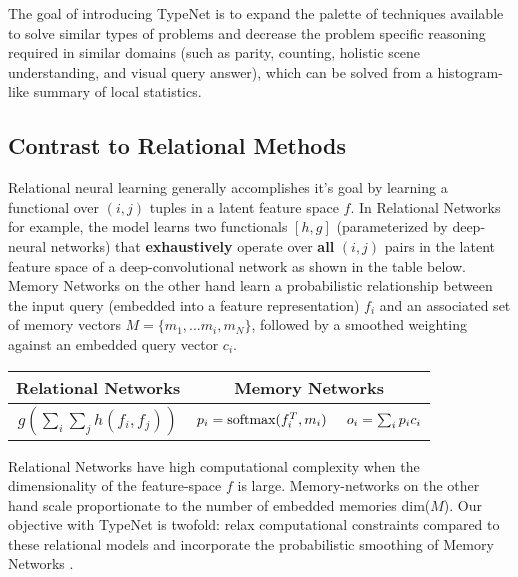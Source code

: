 The goal of introducing TypeNet is to expand the palette of
techniques available to solve similar types of problems and decrease
the problem specific reasoning required in similar
domains (such as parity, counting, holistic scene understanding, and
visual query answer), which can be solved from a histogram-like summary of
local statistics.

\subsection{Contrast to Relational Methods}

Relational neural learning generally accomplishes it's goal by
learning a functional over $(i,j)$ tuples in a latent feature space $f$. In
Relational Networks \cite{santoro2017simple} for example, the
model learns two functionals $[h, g]$ (parameterized by
deep-neural networks) that \textbf{exhaustively} operate over \textbf{all} $(i,j)$ pairs
in the latent feature space of a deep-convolutional network as shown
in the table below.
Memory Networks \cite{weston2014memory} on the other hand learn a probabilistic relationship
between the input query (embedded into a feature representation) $f_i$ and an
associated set of memory vectors $M = \{m_1, ... m_i, m_N \}$, followed by a smoothed weighting against an embedded query
vector $c_i$.
\vskip -0.2in
{\renewcommand{\arraystretch}{1.15}
\begin{center}
\begin{tabular}{ c | c } \hline
  Relational Networks & Memory Networks \\ \hline
  $g(\sum_i \sum_j h(f_i, f_j))$ & $p_i = \text{softmax}(f_i^T,
                                         m_i) \hspace{0.2in}    o_i =
                                         \sum_i p_i c_i$
\end{tabular}\label{rel_mem_net}
\end{center}
}                                     


Relational Networks \cite{santoro2017simple} have high computational
complexity when the dimensionality of the feature-space
$f$ is large. Memory-networks on the other hand scale proportionate
to the number of embedded memories dim($M$). Our objective with TypeNet
is twofold: relax computational constraints compared to these relational models and incorporate the probabilistic smoothing of Memory Networks \cite{weston2014memory}.

